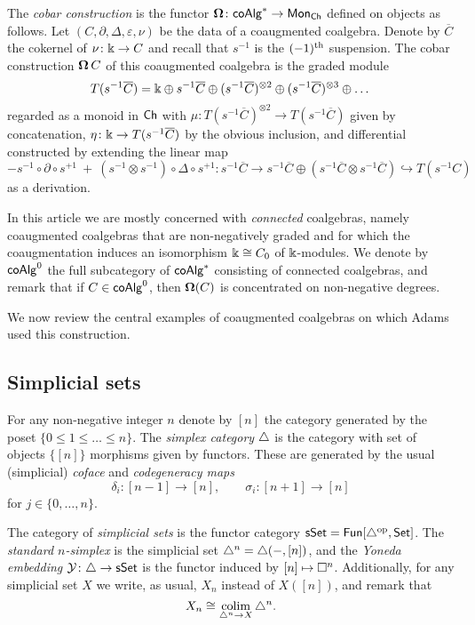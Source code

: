 The \textit{cobar construction} is the functor $\operatorname{\mathbf{\Omega}} \colon \mathsf{coAlg}^\ast \to \mathsf{Mon}_{\mathsf{Ch}}$ defined on objects as follows.
Let $(C, \partial, \Delta, \varepsilon, \nu)$ be the data of a coaugmented coalgebra.
Denote by $\overline{C}$ the cokernel of $\nu \colon \Bbbk \to C$ and recall that $s^{-1}$ is the $(-1)^\mathrm{th}$ suspension.
The cobar construction $\operatorname{\mathbf{\Omega}} C$ of this coaugmented coalgebra is the graded module
\[
T(s^{-1} \overline{C}) = \Bbbk \oplus s^{-1}\overline{C} \oplus (s^{-1}\overline{C})^{\otimes 2} \oplus (s^{-1}\overline{C})^{\otimes 3} \oplus \dots
\]
regarded as a monoid in $\mathsf{Ch}$ with $\mu \colon T(s^{-1} \overline{C})^{\otimes 2} \to T(s^{-1} \overline{C})$ given by concatenation, $\eta \colon \Bbbk \to T(s^{-1} \overline{C})$ by the obvious inclusion, and differential constructed by extending the linear map
\[
- s^{-1} \circ \partial \circ s^{+1} \ + \ (s^{-1} \otimes s^{-1}) \circ \Delta \circ s^{+1} \colon
s^{-1} \overline{C} \to s^{-1}\overline{C} \oplus (s^{-1}\overline{C} \otimes s^{-1}\overline{C}) \hookrightarrow T(s^{-1}C)
\]
as a derivation.

In this article we are mostly concerned with \textit{connected} coalgebras, namely coaugmented  coalgebras that are non-negatively graded and for which the coaugmentation induces an isomorphism $\Bbbk \cong C_0$ of $\Bbbk$-modules.
We denote by $\mathsf{coAlg}^0$ the full subcategory of $\mathsf{coAlg}^\ast$ consisting of connected coalgebras, and remark that if $C \in \mathsf{coAlg}^0$, then $ \operatorname{\mathbf{\Omega}}(C)$ is concentrated on non-negative degrees.

We now review the central examples of coaugmented coalgebras on which Adams used this construction.

\subsection{Simplicial sets}

For any non-negative integer $n$ denote by $[n]$ the category generated by the poset $\{0 \leq 1 \leq \dots \leq n\}$.
The \textit{simplex category} $\triangle$ is the category with set of objects $\big\{ [n] \big\}$ morphisms given by functors.
These are generated by the usual (simplicial) \textit{coface} and \textit{codegeneracy maps}
\[
\delta_i \colon [n-1] \to [n], \qquad \sigma_i \colon [n+1] \to [n]
\]
for $j \in \{0, \dots, n\}$.

The category of \textit{simplicial sets} is the functor category $\mathsf{sSet} = \mathsf{Fun}[\triangle^{\mathrm{op}}, \mathsf{Set}]$.
The \textit{standard $n$-simplex} is the simplicial set $\triangle^n = \triangle(-, [n])$, and the \textit{Yoneda embedding} $\operatorname{\mathcal{Y}} \colon \triangle \to \mathsf{sSet}$ is the functor induced by $[n] \mapsto \square^n$.
Additionally, for any simplicial set $X$ we write, as usual, $X_n$ instead of $X([n])$, and remark that
\[
X_n \cong \operatorname*{colim}_{\triangle^n \to X} \triangle^n.
\]

